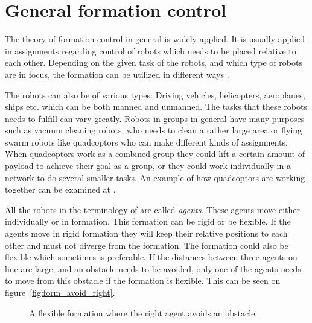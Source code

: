 \section{General formation control}


The theory of formation control in general is widely applied. It is usually applied in assignments regarding control of robots which needs to be placed relative to each other. Depending on the given task of the robots, and which type of robots are in focus, the formation can be utilized in different ways \cite{muv-survey1}.

The robots can also be of various types: Driving vehicles, helicopters, aeroplanes, ships etc. which can be both manned and unmanned. The tasks that these robots needs to fulfill can vary greatly. Robots in groups in general have many purposes such as vacuum cleaning robots, who needs to clean a rather large area or flying swarm robots like quadcoptors who can make different kinds of assignments. When quadcoptors work as a combined group they could lift a certain amount of payload to achieve their goal as a group, or they could work individually in a network to do several smaller tasks. An example of how quadcoptors are working together can be examined at \citep{ethswarm}.

All the robots in the terminology of \cite{muv-survey} are called \textit{agents}. These agents move either individually or in formation. This formation can be rigid or be flexible. If the agents move in rigid formation they will keep their relative positions to each other and must not diverge from the formation. The formation could also be flexible which sometimes is preferable. If the distances between three agents on line are large, and an obstacle needs to be avoided, only one of the agents needs to move from this obstacle if the formation is flexible. This can be seen on figure~\vref{fig:form_avoid_right}.
\begin{figure}[htbp]
	\centering
	
	\caption{A flexible formation where the right agent avoids an obstacle.}
	\label{fig:form_avoid_right}
\end{figure}

